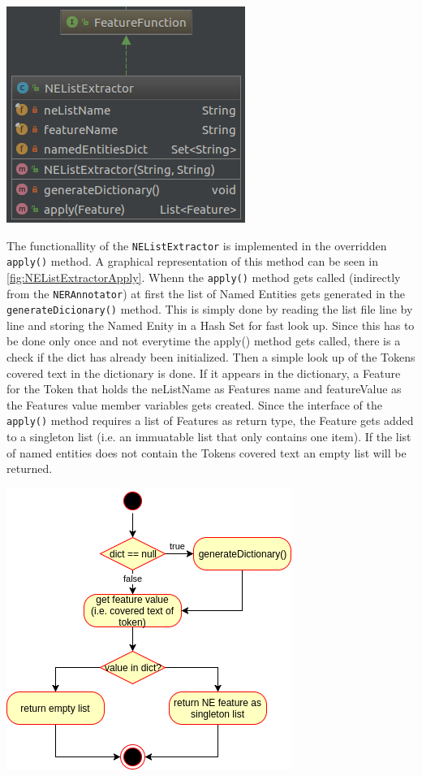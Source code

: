 \documentclass[11pt, english]{article}
\begin{document}
\includegraphics[scale=0.75]{gfx/NEListExtractor.png}
\label{fig:NEListExtractor}

The functionallity of the \verb/NEListExtractor/ is implemented in the overridden \verb/apply()/ method. A graphical representation of this method can be seen in \ref{fig:NEListExtractorApply}. Whenn the \verb/apply()/ method gets called (indirectly from the \verb/NERAnnotator/) at first the list of Named Entities gets generated in the \verb/generateDicionary()/ method. This is simply done by reading the list file line by line and storing the Named Enity in a Hash Set for fast look up. Since this has to be done only once and not everytime the apply() method gets called, there is a check if the dict has already been initialized. Then a simple look up of the Tokens covered text in the dictionary is done. If it appears in the dictionary, a Feature for the Token that holds the neListName as Features name and featureValue as the Features value member variables gets created. Since the interface of the \verb/apply()/ method requires a list of Features as return type, the Feature gets added to a singleton list (i.e. an immuatable list that only contains one item). If the list of named entities does not contain the Tokens covered text an empty list will be returned.

\includegraphics[scale=0.75]{gfx/apply.png}
\label{fig:NEListExtractorApply}
\end{document}
